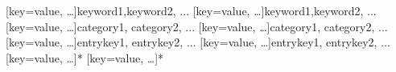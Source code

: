 \begin{ltxsyntax}

[key=value, \dots]{keyword1,keyword2, ...}
[key=value, \dots]{keyword1,keyword2, ...}
[key=value, \dots]{category1, category2, ...}
[key=value, \dots]{category1, category2, ...}
[key=value, \dots]{entrykey1, entrykey2, ...}
[key=value, \dots]{entrykey1, entrykey2, ...}
[key=value, \dots]{*}
[key=value, \dots]{*}

\end{ltxsyntax}

